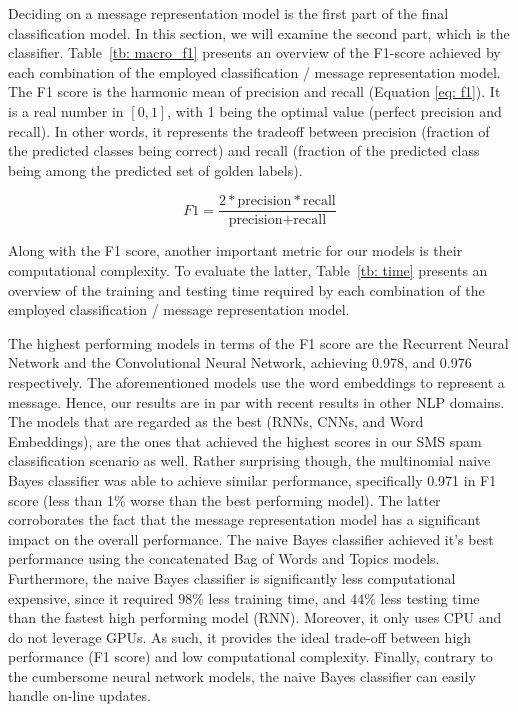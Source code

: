 \documentclass[letterpaper]{article}
\begin{document}
Deciding on a message representation model is the first part of the final classification model. In this section, we will examine the second part, which is the classifier. Table~\ref{tb: macro_f1} presents an overview of the F1-score achieved by each combination of the employed classification / message representation model. The F1 score is the harmonic mean of precision and recall (Equation \ref{eq: f1}). It is a real number in $[0, 1]$, with 1 being the optimal value (perfect precision and recall). In other words, it represents the tradeoff between precision (fraction of the predicted classes being correct) and recall (fraction of the predicted class being among the predicted set of golden labels).

\begin{equation} \label{eq: f1}
	F1 = \frac{2 * \text{precision} * \text{recall}}{\text{precision} + \text{recall}}
\end{equation}

Along with the F1 score, another important metric for our models is their computational complexity. To evaluate the latter, Table~\ref{tb: time} presents an overview of the training and testing time required by each combination of the employed classification / message representation model.

The highest performing models in terms of the F1 score are the Recurrent Neural Network and the Convolutional Neural Network, achieving 0.978, and 0.976 respectively. The aforementioned models use the word embeddings to represent a message. Hence, our results are in par with recent results in other NLP domains. The models that are regarded as the best (RNNs, CNNs, and Word Embeddings), are the ones that achieved the highest scores in our SMS spam classification scenario as well. Rather surprising though, the multinomial naive Bayes classifier was able to achieve similar performance, specifically 0.971 in F1 score (less than 1\% worse than the best performing model). The latter corroborates the fact that the message representation model has a significant impact on the overall performance. The naive Bayes classifier achieved it's best performance using the concatenated Bag of Words and Topics models. Furthermore, the naive Bayes classifier is significantly less computational expensive, since it required $98\%$ less training time, and $44\%$ less testing time than the fastest high performing model (RNN). Moreover, it only uses CPU and do not leverage GPUs. As such, it provides the ideal trade-off between high performance (F1 score) and low computational complexity. Finally, contrary to the cumbersome neural network models, the naive Bayes classifier can easily handle on-line updates.
\end{document}

